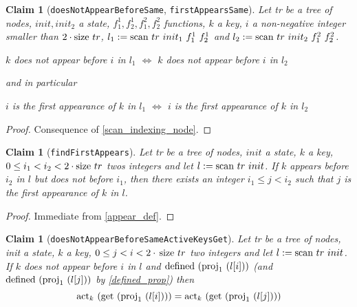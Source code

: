 \documentclass{article}
\newtheorem{claim}[lemma]{Claim}
\newcommand{\textfun}[1]{\textup{#1}}
\newcommand{\textcode}[1]{\texttt{#1}}
\newcommand{\longscan}[4]{\textfun{scan}\ #1\ #2\ #3 \ #4}
\newcommand{\scan}[2]{\textfun{scan}\ #1\ #2}
\newcommand{\defined}[1]{\textfun{defined}\ #1}
\newcommand{\get}[1]{\textfun{get}\ #1}
\newcommand{\size}[1]{\textfun{size}\ #1}
\newcommand{\fst}[1]{\textfun{proj}_1\ #1}
\newcommand{\actkey}[2]{\textfun{act}_{#1}\ #2}
\begin{document}
\begin{claim}[\textcode{doesNotAppearBeforeSame}, \textcode{firstAppearsSame}]
    \label{appear_same}
    Let tr be a tree of nodes, $init, init_2$ a state, $f^1_1, f^1_2, f^2_1, f^2_2$ functions, $k$ a key, $i$ a non-negative integer smaller than $2 \cdot \size{tr}$,
     $l_1 := \longscan{tr}{init_1}{f^1_1}{f^1_2}$ and $l_2 := \longscan{tr}{init_2}{f^2_1}{f^2_2}$. 
     \begin{center}
        $k$ does not appear before $i$ in $l_1$ $\iff$ $k$ does not appear before $i$ in $l_2$
     \end{center}  
     and in particular
     \begin{center}
        $i$ is the first appearance of $k$ in $l_1$ $\iff$ $i$ is the first appearance of $k$ in $l_2$
     \end{center}  
\end{claim}

\begin{proof}
    Consequence of \cref{scan_indexing_node}.
\end{proof}

\begin{claim}[\textcode{findFirstAppears}]
    \label{find_first_appear}
    Let tr be a tree of nodes, $init$ a state, $k$ a key, $0 \leq i_1 < i_2 < 2\cdot \size{tr}$ twos integers and
    let $l := \scan{tr}{init}$. If $k$ appears before $i_2$ in $l$ but does not before $i_1$, then there exists an integer 
    $i_1 \leq j < i_2$ such that $j$ is the first appearance of $k$ in $l$.
\end{claim}

\begin{proof}
    Immediate from \cref{appear_def}.
\end{proof}

\begin{claim}[\textcode{doesNotAppearBeforeSameActiveKeysGet}]
    \label{actkey_not_appear}
    Let tr be a tree of nodes, init a state, $k$ a key, $0 \leq j < i < 2\cdot\, \size{tr}$ two integers and let $l := \scan{tr}{init}$. 
    If $k$ does not appear before $i$ in $l$ and $\defined{(\fst{(l[i])})}$ (and  $\defined{(\fst{(l[j])})}$ by \cref{defined_prop}) then 
    \[\actkey{k}{(\get{(\fst{(l[i])})})} = \actkey{k}{(\get{(\fst{(l[j])})})}\]
\end{claim}
\end{document}
